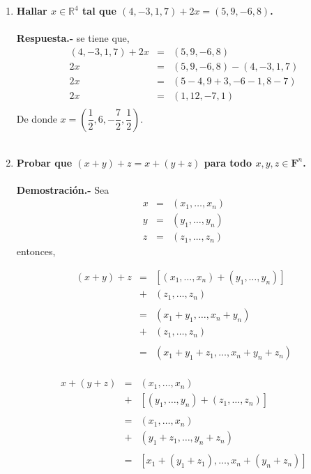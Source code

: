 \begin{multicols}{2}
\begin{enumerate}
     \item \textbf{ \boldmath Hallar $x\in \mathbb{R}^4$ tal que $(4,-3,1,7)+2x=(5,9,-6,8)$.}\\\\
	 \textbf{Respuesta.-}\; se tiene que,
	 $$\begin{array}{rcl}
	     (4,-3,1,7)+2x&=&(5,9,-6,8)\\
			  2x&=&(5,9,-6,8)-(4,-3,1,7)\\
			    2x&=&(5-4,9+3,-6-1,8-7)\\
			    2x&=&(1,12,-7,1)\\
	 \end{array}$$
	 De donde $x=\left(\dfrac{1}{2},6,-\dfrac{7}{2},\dfrac{1}{2}\right).$\\\\

     \item \textbf{\boldmath Probar que $(x+y)+z=x+(y+z)$ para todo $x,y,z\in \mathbf{F}^n$.}\\\\
	 \textbf{Demostración.-}\; Sea 
	 $$\begin{array}{rcl}
	     x&=&(x_1,\ldots,x_n)\\ 
	     y&=&(y_1,\ldots,y_n)\\
	     z&=&(z_1,\ldots,z_n)
	 \end{array}$$ 
	     entonces,

	 $$\begin{array}{rcl}
	     (x+y)+z&=&\left[(x_1,\ldots,x_n)+(y_1,\ldots,y_n)\right]\\
		    &+&(z_1,\ldots,z_n)\\\\
		    &=&(x_1+y_1,\ldots,x_n+y_n)\\
		    &+&(z_1,\ldots ,z_n)\\\\
		    &=&(x_1+y_1+z_1,\ldots,x_n+y_n+z_n)\\
	 \end{array}$$

	 $$\begin{array}{rcl}
	     x+(y+z)&=&(x_1,\ldots,x_n)\\
		    &+&\left[(y_1,\ldots,y_n)+(z_1,\ldots,z_n)\right]\\\\
		    &=&(x_1,\ldots,x_n)\\
		    &+&(y_1 + z_1,\ldots ,y_n + z_n)\\\\
		    &=&[x_1+(y_1+z_1),\ldots,x_n+(y_n+z_n)]\\
	 \end{array}$$


\end{enumerate}
\end{multicols}
